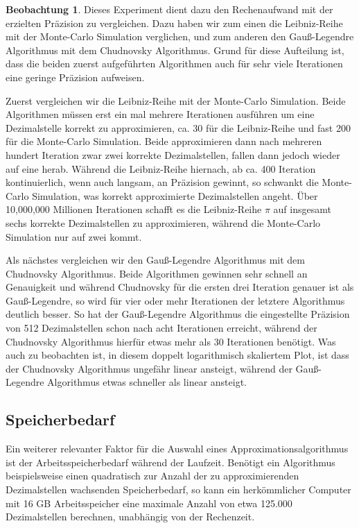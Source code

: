 \documentclass{scrartcl}
\theoremstyle{definition}
\newtheorem{approximation sequence}{Annäherungsfolge}
\newtheorem{observation}{Beobachtung}
\begin{document}
\begin{observation}
    Dieses Experiment dient dazu den Rechenaufwand mit der erzielten Präzision zu vergleichen. Dazu haben wir zum einen die Leibniz-Reihe mit 
    der Monte-Carlo Simulation verglichen, und zum anderen den Gauß-Legendre Algorithmus mit dem Chudnovsky Algorithmus.
    Grund für diese Aufteilung ist, dass die beiden zuerst aufgeführten Algorithmen auch für sehr viele Iterationen eine geringe Präzision aufweisen.
    
    Zuerst vergleichen wir die Leibniz-Reihe mit der Monte-Carlo Simulation. Beide Algorithmen müssen erst ein mal mehrere Iterationen ausführen um eine
    Dezimalstelle korrekt zu approximieren, ca. 30 für die Leibniz-Reihe und fast 200 für die Monte-Carlo Simulation. Beide approximieren dann nach mehreren 
    hundert Iteration zwar zwei korrekte Dezimalstellen, fallen dann jedoch wieder auf eine herab.
    Während die Leibniz-Reihe hiernach, ab ca. 400 Iteration kontinuierlich, wenn auch langsam, an Präzision gewinnt, so schwankt die Monte-Carlo Simulation, was korrekt approximierte 
    Dezimalstellen angeht.
    Über 10,000,000 Millionen Iterationen schafft es die Leibniz-Reihe \(\pi\) auf insgesamt sechs korrekte Dezimalstellen zu approximieren, während die Monte-Carlo Simulation nur auf zwei kommt.
    
    Als nächstes vergleichen wir den Gauß-Legendre Algorithmus mit dem Chudnovsky Algorithmus. Beide Algorithmen gewinnen sehr schnell an Genauigkeit und während Chudnovsky für die ersten drei
    Iteration genauer ist als Gauß-Legendre, so wird für vier oder mehr Iterationen der letztere Algorithmus deutlich besser. So hat der Gauß-Legendre Algorithmus die eingestellte Präzision von 512 Dezimalstellen schon nach
    acht Iterationen erreicht, während der Chudnovsky Algorithmus hierfür etwas mehr als 30 Iterationen benötigt. Was auch zu beobachten ist, in diesem doppelt logarithmisch skaliertem Plot, ist dass der Chudnovsky Algorithmus
    ungefähr linear ansteigt, während der Gauß-Legendre Algorithmus etwas schneller als linear ansteigt.
\end{observation}

\pagebreak

\subsection{Speicherbedarf}

Ein weiterer relevanter Faktor für die Auswahl eines Approximationsalgorithmus
ist der Arbeitsspeicherbedarf während der Laufzeit. Benötigt ein Algorithmus
beispielsweise einen quadratisch zur Anzahl der zu approximierenden
Dezimalstellen wachsenden Speicherbedarf, so kann ein herkömmlicher Computer
mit 16 GB Arbeitsspeicher eine maximale Anzahl von etwa 125.000 Dezimalstellen
berechnen, unabhängig von der Rechenzeit.
\end{document}
